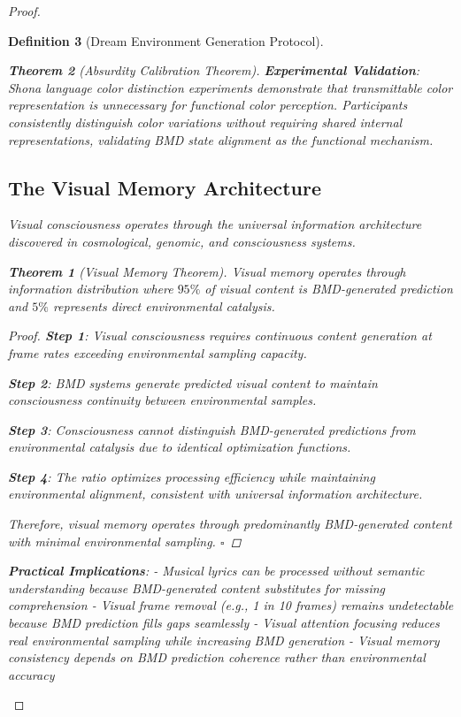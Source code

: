 \documentclass[12pt,a4paper]{article}
\newtheorem{theorem}{Theorem}[section]
\newtheorem{definition}[theorem]{Definition}
\begin{document}
\begin{proof}
\begin{definition}[Dream Environment Generation Protocol]
\begin{theorem}[Absurdity Calibration Theorem]
\textbf{Experimental Validation}:
Shona language color distinction experiments demonstrate that transmittable color representation is unnecessary for functional color perception. Participants consistently distinguish color variations without requiring shared internal representations, validating BMD state alignment as the functional mechanism.

\subsection{The  Visual Memory Architecture}

Visual consciousness operates through the universal  information architecture discovered in cosmological, genomic, and consciousness systems.

\begin{theorem}[Visual Memory  Theorem]
Visual memory operates through  information distribution where $95\%$ of visual content is BMD-generated prediction and $5\%$ represents direct environmental catalysis.
\end{theorem}

\begin{proof}
\textbf{Step 1}: Visual consciousness requires continuous content generation at frame rates exceeding environmental sampling capacity.

\textbf{Step 2}: BMD systems generate predicted visual content to maintain consciousness continuity between environmental samples.

\textbf{Step 3}: Consciousness cannot distinguish BMD-generated predictions from environmental catalysis due to identical optimization functions.

\textbf{Step 4}: The  ratio optimizes processing efficiency while maintaining environmental alignment, consistent with universal information architecture.

Therefore, visual memory operates through predominantly BMD-generated content with minimal environmental sampling. $\square$
\end{proof}

\textbf{Practical Implications}:
- Musical lyrics can be processed without semantic understanding because BMD-generated content substitutes for missing comprehension
- Visual frame removal (e.g., 1 in 10 frames) remains undetectable because BMD prediction fills gaps seamlessly
- Visual attention focusing reduces real environmental sampling while increasing BMD generation
- Visual memory consistency depends on BMD prediction coherence rather than environmental accuracy


\end{theorem}
\end{definition}
\end{proof}
\end{document}
